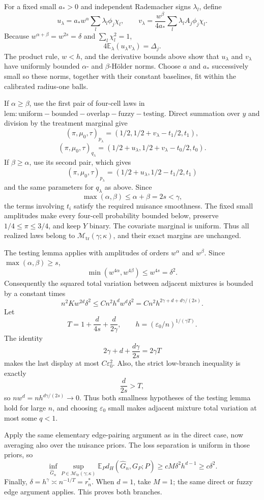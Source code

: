 For a fixed small \(a_*>0\) and independent Rademacher signs \(\lambda_l\), define
\[
 u_\lambda=a_*w^\alpha\sum_l\lambda_l\phi_j\chi_l,
 \qquad
 v_\lambda=\frac{w^\beta}{4a_*}
 \sum_l\lambda_lA_j\phi_j\chi_l.
\]
Because \(w^{\alpha+\beta}=w^{2s}=\delta\) and \(\sum_l\chi_l^2=1\),
\[
 4\mathbb E_\lambda(u_\lambda v_\lambda)=\Delta_j.
\]
The product rule, \(w<h\), and the derivative bounds above show that \(u_\lambda\) and \(v_\lambda\) have uniformly bounded \(\alpha\)- and \(\beta\)-Hölder norms. Choose \(a\) and \(a_*\) successively small so these norms, together with their constant baselines, fit within the calibrated radius-one balls.

If \(\alpha\ge\beta\), use the first pair of four-cell laws in \(\mathrm{lem:uniform-bounded-overlap-fuzzy-testing}\). Direct summation over \(y\) and division by the treatment marginal give
\[
 (\pi,\mu_0,\tau)_{p_\lambda}
 =(1/2,1/2+v_\lambda-t_1/2,t_1),
\]
\[
 (\pi,\mu_0,\tau)_{q_\lambda}
 =(1/2+u_\lambda,1/2+v_\lambda-t_0/2,t_0).
\]
If \(\beta\ge\alpha\), use its second pair, which gives
\[
 (\pi,\mu_0,\tau)_{p_\lambda}
 =(1/2+u_\lambda,1/2-t_1/2,t_1)
\]
and the same parameters for \(q_\lambda\) as above. Since
\[
 \max(\alpha,\beta)\le\alpha+\beta=2s<\gamma,
\]
the terms involving \(t_i\) satisfy the required nuisance smoothness. The fixed small amplitudes make every four-cell probability bounded below, preserve \(1/4\le\pi\le3/4\), and keep \(Y\) binary. The covariate marginal is uniform. Thus all realized laws belong to \(\mathcal M_{\mathrm{tr}}(\gamma;\kappa)\), and their exact margins are unchanged.

The testing lemma applies with amplitudes of orders \(w^\alpha\) and \(w^\beta\). Since \(\max(\alpha,\beta)\ge s\),
\[
 \min(w^{4\alpha},w^{4\beta})\le w^{4s}=\delta^2.
\]
Consequently the squared total variation between adjacent mixtures is bounded by a constant times
\[
 n^2Kw^{2d}\delta^2
 \le Cn^2h^dw^d\delta^2
 =Cn^2h^{2\gamma+d+d\gamma/(2s)}.
\]
Let
\[
 T=1+\frac d{4s}+\frac d{2\gamma},
 \qquad
 h=(\varepsilon_0/n)^{1/(\gamma T)}.
\]
The identity
\[
 2\gamma+d+\frac{d\gamma}{2s}=2\gamma T
\]
makes the last display at most \(C\varepsilon_0^2\). Also, the strict low-branch inequality is exactly
\[
 \frac d{2s}>T,
\]
so \(nw^d=nh^{d\gamma/(2s)}\to0\). Thus both smallness hypotheses of the testing lemma hold for large \(n\), and choosing \(\varepsilon_0\) small makes adjacent mixture total variation at most some \(q<1\).

Apply the same elementary edge-pairing argument as in the direct case, now averaging also over the nuisance priors. The loss separation is uniform in those priors, so
\[
 \inf_{\widehat G_n}
 \sup_{P\in\mathcal M_{\mathrm{tr}}(\gamma;\kappa)}
 \mathbb E_Pd_H(\widehat G_n,G_P;P)
 \ge cM\delta^2h^{d-1}\ge c\delta^2.
\]
Finally, \(\delta=h^\gamma\asymp n^{-1/T}=r_n^*\). When \(d=1\), take \(M=1\); the same direct or fuzzy edge argument applies. This proves both branches.
